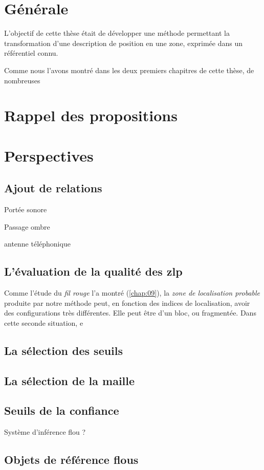 \section{Générale}

L'objectif de cette thèse était de développer une méthode permettant
la transformation d'une description de position en une zone, exprimée
dans un référentiel connu.


Comme nous l'avons montré dans les deux premiers chapitres de cette
thèse, de nombreuses



\section{Rappel des propositions}

\section{Perspectives}

\subsection{Ajout de relations}

Portée sonore

Passage ombre

antenne téléphonique

\subsection{L'évaluation de la qualité des \ac{zlp}}

Comme l'étude du \emph{fil rouge} l'a montré (\autoref{chap:09}), la
\emph{zone de localisation probable} produite par notre méthode peut,
en fonction des indices de localisation, avoir des configurations très
différentes. Elle peut être d'un bloc, ou fragmentée. Dans cette
seconde situation,  e

\subsection{La sélection des seuils}

\subsection{La sélection de la maille}


\subsection{Seuils de la confiance}

Système d'inférence flou ?

\subsection{Objets de référence flous}


